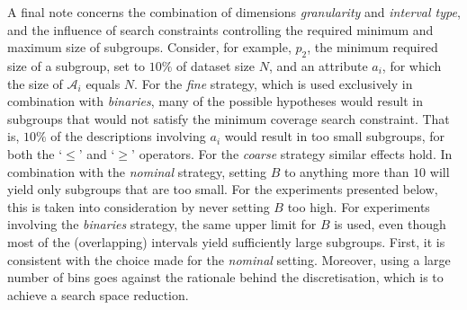 \documentclass[smallextended]{svjour3}
\newcommand{\op}[1]{`$#1$'}
\newcommand{\dimension}{\emph}
\newcommand{\parameter}{\emph}
\newcommand{\binaries}{\parameter{binaries}}
\newcommand{\nominal}{\parameter{nominal}}
\newcommand{\fine}{\parameter{fine}}
\newcommand{\coarse}{\parameter{coarse}}
\begin{document}
A final note concerns the combination of dimensions \dimension{granularity} and \dimension{interval type}, and the influence of search constraints controlling the required minimum and maximum size of subgroups.
Consider, for example, $p_2$, the minimum required size of a subgroup, set to $10\%$ of dataset size $N$, and an attribute $a_i$, for which the size of $\mathcal{A}_i$ equals $N$.
For the \fine{} strategy, which is used exclusively in combination with \binaries{}, many of the possible hypotheses would result in subgroups that would not satisfy the minimum coverage search constraint.
That is, $10\%$ of the descriptions involving $a_i$ would result in too small subgroups, for both the \op{\leq} and \op{\geq} operators.
For the \coarse{} strategy similar effects hold.
In combination with the \nominal{} strategy, setting $B$ to anything more than $10$ will yield only subgroups that are too small.
For the experiments presented below, this is taken into consideration by never setting $B$ too high.
For experiments involving the \binaries{} strategy, the same upper limit for $B$ is used, even though most of the (overlapping) intervals yield sufficiently large subgroups.
First, it is consistent with the choice made for the \nominal{} setting.
Moreover, using a large number of bins goes against the rationale behind the discretisation, which is to achieve a search space reduction.

%
%
\end{document}

